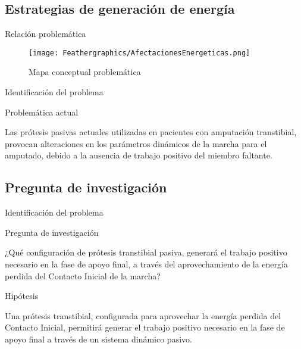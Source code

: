 \documentclass[10pt]{beamer}
\begin{document}
\subsection{Estrategias de generación de energía}

\begin{frame}{Relación problemática}

\begin{figure}
\begin{centering}
\texttt{[image: Feathergraphics/AfectacionesEnergeticas.png]}
\par\end{centering}
\caption{Mapa conceptual problemática}

\end{figure}

\end{frame}

\begin{frame}{Identificación del problema}

\begin{block}{Problemática actual}

Las prótesis pasivas actuales utilizadas en pacientes con amputación transtibial, provocan alteraciones en los parámetros dinámicos de la marcha para el amputado, debido a la ausencia de trabajo positivo del miembro faltante.

\end{block}
	\end{frame}


\subsection{Pregunta de investigación}
\begin{frame}{Identificación del problema}

\begin{block}{Pregunta de investigación}

¿Qué configuración de prótesis transtibial pasiva, generará el trabajo positivo necesario en la fase de apoyo final, a través del aprovechamiento de la energía perdida del Contacto Inicial de la marcha?

\end{block}
\begin{block}{Hipótesis}

Una prótesis transtibial, configurada para aprovechar la energía perdida del Contacto Inicial, permitirá generar el trabajo positivo necesario en la fase de apoyo final a través de un sistema dinámico pasivo.

\end{block}
\end{frame}
\end{document}
